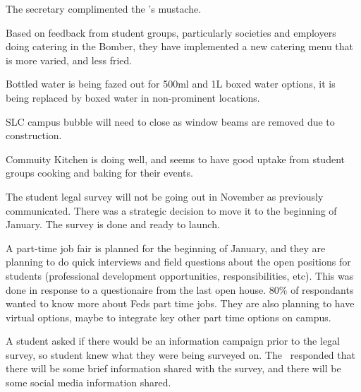 \begin{information}

    The secretary complimented the \vpof's mustache. 

    Based on feedback from student groups, particularly societies and employers
    doing catering in the Bomber, they have implemented a new catering menu
    that is more varied, and less fried. 

    Bottled water is being fazed out for 500ml and 1L boxed water options, it
    is being replaced by boxed water in non-prominent locations.

    SLC campus bubble will need to close as window beams are removed due to 
    construction.

    Commuity Kitchen is doing well, and seems to have good uptake from student 
    groups cooking and baking for their events. 

    The student legal survey will not be going out in November as previously 
    communicated. There was a strategic decision to move it to the beginning 
    of January. The survey is done and ready to launch.

    A part-time job fair is planned for the beginning of January, and they are
    planning to do quick interviews and field questions about the open 
    positions for students (professional development opportunities, 
    responsibilities, etc). This was done in response to a questionaire from 
    the last open house. 80\% of respondants wanted to know more about Feds
    part time jobs. They are also planning to have virtual options, maybe to 
    integrate key other part time options on campus.

    A student asked if there would be an information campaign prior to the 
    legal survey, so student knew what they were being surveyed on. The \vped\
    responded that there will be some brief information shared with the survey,
    and there will be some social media information shared. 

\end{information}

